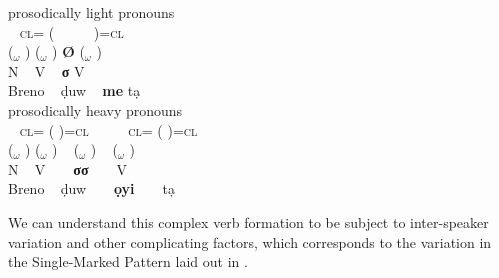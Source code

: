 \documentclass[output=paper]{langsci/langscibook}
\begin{document}
\ea\label{ex:rolle:48}
\ea prosodically light pronouns\\
\gllll
~      \textsc{cl}= ( ~   ~  ~       )=\textsc{cl}\\
($_\omega$    )  ($_\omega$   )  \textbf{Ø}    ($_\omega$  )  \\
{\db}N ~        {\db}V   ~  \textbf{σ}    {\db}V   \\
{\db}Breno  ~   {\db}ḍuw ~  \textbf{me}   {\db}tạ {} \\ 
\glt \vphantom{l}
\ex prosodically heavy pronouns\\
\gllll
  ~         \textsc{cl}= (                  )=\textsc{cl} ~    ~   ~   \textsc{cl}= (                )=\textsc{cl}\\
 ($_\omega$ )            ($_\omega$   )     ~             ($_\omega$  )             ~    ($_\omega$  )\\
{\db}N      ~             {\db}V       ~     ~             {\db}\textbf{σσ}  ~ ~         {\db}V  ~\\
 {\db}Breno ~             {\db}ḍuw     ~     ~             {\db}\textbf{ọyi} ~ ~         {\db}tạ ~\\
\z
\z




We can understand this complex verb formation to be subject to inter-speaker variation and other complicating factors, which corresponds to the variation in the Single-Marked Pattern laid out in .
\end{document}

